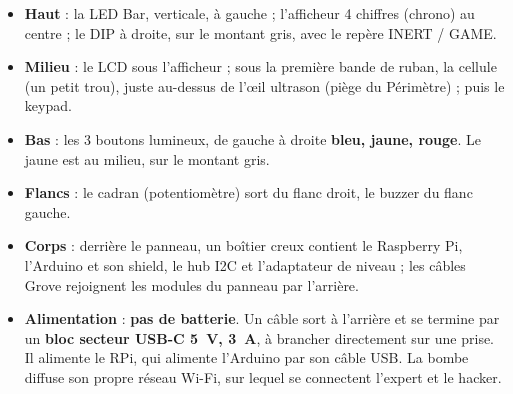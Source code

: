\documentclass[11pt,a4paper]{article}
\begin{document}
\begin{itemize}
  \item \textbf{Haut} : la LED Bar, verticale, à gauche ; l'afficheur 4 chiffres (chrono) au centre ; le DIP à droite, sur le montant gris, avec le repère \og INERT / GAME\fg{}.
  \item \textbf{Milieu} : le LCD sous l'afficheur ; sous la première bande de ruban, la cellule (un petit trou), juste au-dessus de l'œil ultrason (piège du Périmètre) ; puis le keypad.
  \item \textbf{Bas} : les 3 boutons lumineux, de gauche à droite \textbf{bleu, jaune, rouge}. Le jaune est au milieu, sur le montant gris.
  \item \textbf{Flancs} : le cadran (potentiomètre) sort du flanc droit, le buzzer du flanc gauche.
  \item \textbf{Corps} : derrière le panneau, un boîtier creux contient le Raspberry Pi, l'Arduino et son shield, le hub I2C et l'adaptateur de niveau ; les câbles Grove rejoignent les modules du panneau par l'arrière.
  \item \textbf{Alimentation} : \textbf{pas de batterie}. Un câble sort à l'arrière et se termine par un \textbf{bloc secteur USB-C 5~V, 3~A}, à brancher directement sur une prise. Il alimente le RPi, qui alimente l'Arduino par son câble USB. La bombe diffuse son propre réseau Wi-Fi, sur lequel se connectent l'expert et le hacker.
\end{itemize}
\end{document}

